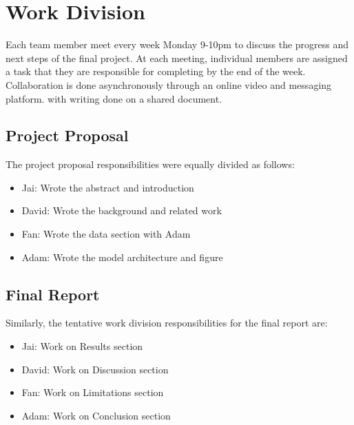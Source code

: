 \documentclass[../main.tex]{subfiles}
\begin{document}
\section{Work Division} 
Each team member meet every week Monday 9-10pm to 
discuss the progress and next steps of the final project. At each meeting, 
individual members are assigned a task that they are responsible for completing 
by the end of the week. Collaboration is done asynchronously through an online 
video and messaging platform. with writing done on a shared document.

\subsection{Project Proposal} 
The project proposal responsibilities were equally divided as follows:

\begin{itemize} 
  \item Jai: Wrote the abstract and introduction 
  \item David: Wrote the background and related work 
  \item Fan: Wrote the data section with Adam 
  \item Adam: Wrote the model architecture and figure 
\end{itemize}

\subsection{Final Report} 

Similarly, the tentative work division responsibilities for the final report are:

\begin{itemize} 
  \item Jai: Work on Results section
  \item David: Work on Discussion section
  \item Fan: Work on Limitations section
  \item Adam: Work on Conclusion section
\end{itemize}
\end{document}
